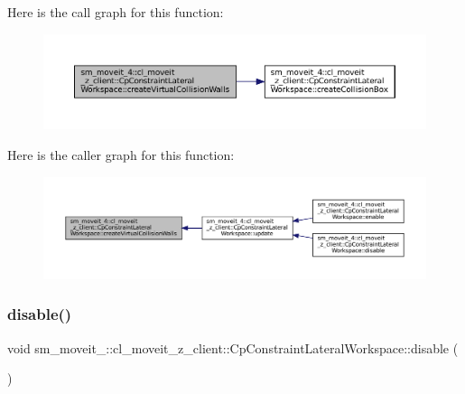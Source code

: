 Here is the call graph for this function\+:
\nopagebreak
\begin{figure}[H]
\begin{center}
\leavevmode
\includegraphics[width=350pt]{classsm__moveit__4_1_1cl__moveit__z__client_1_1CpConstraintLateralWorkspace_abb413c4d73a4f6c7f2feca86624b5c7a_cgraph}
\end{center}
\end{figure}
Here is the caller graph for this function\+:
\nopagebreak
\begin{figure}[H]
\begin{center}
\leavevmode
\includegraphics[width=350pt]{classsm__moveit__4_1_1cl__moveit__z__client_1_1CpConstraintLateralWorkspace_abb413c4d73a4f6c7f2feca86624b5c7a_icgraph}
\end{center}
\end{figure}
\mbox{\label{classsm__moveit__4_1_1cl__moveit__z__client_1_1CpConstraintLateralWorkspace_a8d4567487c11e835447cc98d3046a9e2}} 
\subsubsection{\texorpdfstring{disable()}{disable()}}
{\footnotesize\ttfamily void sm\+\_\+moveit\+\_\+::cl\+\_\+moveit\+\_\+z\+\_\+client\+::\+Cp\+Constraint\+Lateral\+Workspace\+::disable (\begin{DoxyParamCaption}{ }\end{DoxyParamCaption})\hspace{0.3cm}{\ttfamily [inline]}}



